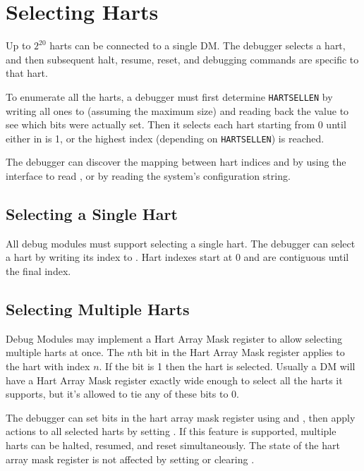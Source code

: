 \section{Selecting Harts} \label{selectingharts}

Up to $2^{20}$ harts can be connected to a single DM. The debugger
selects a hart, and then subsequent halt, resume, reset, and debugging
commands are specific to that hart.

To enumerate all the harts, a debugger must first determine {\tt HARTSELLEN}
by writing  all ones to \Fhartsel (assuming the maximum size) and reading back
the value to see which bits were actually set.  Then it selects each hart
starting from 0 until either \FdmDmstatusAnynonexistent in \RdmDmstatus is 1, or the
highest index (depending on {\tt HARTSELLEN}) is reached.

The debugger can discover the mapping between hart indices and
\Rmhartid by using the interface to read \Rmhartid, or by
reading the system's configuration string.

\subsection {Selecting a Single Hart}

All debug modules must support selecting a single hart.
The debugger can select a hart by writing its index to \Fhartsel.
Hart indexes start at 0 and are contiguous until the final index.

\subsection {Selecting Multiple Harts} \label{hartarraymask}

Debug Modules may implement a Hart Array Mask register to allow selecting
multiple harts at once. The $n$th bit in the Hart Array Mask register applies to
the hart with index $n$. If the bit is 1 then the hart is selected.  Usually a DM
will have a Hart Array Mask register exactly wide enough to select all the
harts it supports, but it's allowed to tie any of these bits to 0.

The debugger can set bits in the hart array mask register using \RdmHawindowsel
and \RdmHawindow, then apply actions to all selected harts by setting \FdmDmcontrolHasel. If
this feature is supported, multiple harts can be halted, resumed, and reset
simultaneously. The state of the hart array mask register is not affected by
setting or clearing \FdmDmcontrolHasel.


